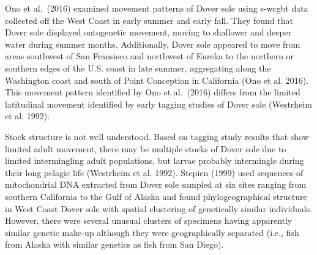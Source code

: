 \documentclass[11pt,
  english,
  a4paper,
]{article}
\begin{document}

Ono et al.~{(2016)\leavevmode\tagmcend\tagstructend} examined movement patterns of Dover sole using \Gls{s-wcgbt} data collected off the West Coast in early summer and early fall. They found that Dover sole displayed ontogenetic movement, moving to shallower and deeper water during summer months. Additionally, Dover sole appeared to move from areas southwest of San Fransisco and northwest of Eureka to the northern or southern edges of the U.S. coast in late summer, aggregating along the Washington coast and south of Point Conception in California {(Ono et al. 2016)\leavevmode\tagmcend\tagstructend}. This movement pattern identified by Ono et al.~{(2016)\leavevmode\tagmcend\tagstructend} differs from the limited latitudinal movement identified by early tagging studies of Dover sole {(Westrheim et al. 1992)\leavevmode\tagmcend\tagstructend}.

\leavevmode\tagmcend\tagstructend\par


Stock structure is not well understood. Based on tagging study results that show limited adult movement, there may be multiple stocks of Dover sole due to limited intermingling adult populations, but larvae probably intermingle during their long pelagic life {(Westrheim et al. 1992)\leavevmode\tagmcend\tagstructend}. Stepien {(1999)\leavevmode\tagmcend\tagstructend} used sequences of mitochondrial DNA extracted from Dover sole sampled at six sites ranging from southern California to the Gulf of Alaska and found phylogeographical structure in West Coast Dover sole with spatial clustering of genetically similar individuals. However, there were several unusual clusters of specimens having apparently similar genetic make-up although they were geographically separated (i.e., fish from Alaska with similar genetics as fish from San Diego).

\leavevmode\tagmcend\tagstructend\par

\end{document}
